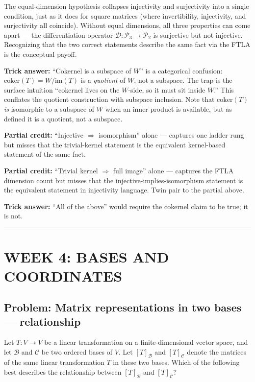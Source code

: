 \documentclass[12pt]{amsart}
\newcommand{\divider}{
  \vspace{-1em}
  \noindent
  \raisebox{-0.15ex}{\textbullet}%
  \hspace{0.5em}%
  \rule[0.5ex]{0.95\textwidth}{1.0pt}%
  \hspace{0.5em}%
  \raisebox{-0.15ex}{\textbullet}%
  \vspace{0em}
}
\begin{document}
The equal-dimension hypothesis collapses injectivity and surjectivity into
a single condition, just as it does for square matrices (where invertibility,
injectivity, and surjectivity all coincide). Without equal dimensions, all
three properties can come apart --- the differentiation operator
$\mathcal{D}: \mathcal{P}_3 \to \mathcal{P}_2$ is surjective but not injective.
Recognizing that the two correct statements describe the same fact via the
FTLA is the conceptual payoff.

\textbf{Trick answer:}
``Cokernel is a subspace of $W$'' is a categorical confusion:
$\mathrm{coker}(T) = W / \mathrm{im}(T)$ is a \emph{quotient} of $W$, not a
subspace. The trap is the surface intuition ``cokernel lives on the
$W$-side, so it must sit inside $W$.'' This conflates the quotient
construction with subspace inclusion. Note that $\mathrm{coker}(T)$ \emph{is}
isomorphic to a subspace of $W$ when an inner product is available, but as
defined it is a quotient, not a subspace.

\textbf{Partial credit:}
``Injective $\Rightarrow$ isomorphism'' alone --- captures one ladder rung
but misses that the trivial-kernel statement is the equivalent kernel-based
statement of the same fact.

\textbf{Partial credit:}
``Trivial kernel $\Rightarrow$ full image'' alone --- captures the FTLA
dimension count but misses that the injective-implies-isomorphism statement
is the equivalent statement in injectivity language. Twin pair to the
partial above.

\textbf{Trick answer:}
``All of the above'' would require the cokernel claim to be true; it is not.

\divider

\section*{WEEK 4: BASES AND COORDINATES}

\subsection*{Problem: Matrix representations in two bases --- relationship}

Let $T: V \to V$ be a linear transformation on a finite-dimensional vector
space, and let $\mathcal{B}$ and $\mathcal{C}$ be two ordered bases of $V$.
Let $[T]_{\mathcal{B}}$ and $[T]_{\mathcal{C}}$ denote the matrices of the
same linear transformation $T$ in these two bases. Which of the following
best describes the relationship between $[T]_{\mathcal{B}}$ and $[T]_{\mathcal{C}}$?
\end{document}
